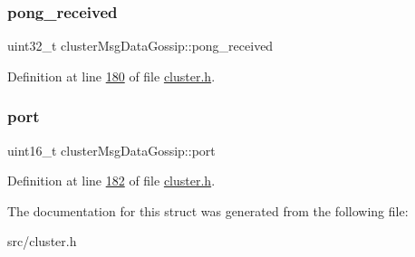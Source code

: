 \mbox{\label{structclusterMsgDataGossip_acd8f681b7d76d00bf70d27b1130c97df}} 
\subsubsection{\texorpdfstring{pong\+\_\+received}{pong\_received}}
{\footnotesize\ttfamily uint32\+\_\+t cluster\+Msg\+Data\+Gossip\+::pong\+\_\+received}



Definition at line \hyperlink{cluster_8h_source_l00180}{180} of file \hyperlink{cluster_8h_source}{cluster.\+h}.

\mbox{\label{structclusterMsgDataGossip_a6a38835f189c60b4c9ea9be5c817e6af}} 
\subsubsection{\texorpdfstring{port}{port}}
{\footnotesize\ttfamily uint16\+\_\+t cluster\+Msg\+Data\+Gossip\+::port}



Definition at line \hyperlink{cluster_8h_source_l00182}{182} of file \hyperlink{cluster_8h_source}{cluster.\+h}.



The documentation for this struct was generated from the following file\+:\begin{DoxyCompactItemize}
\item 
src/cluster.\+h\end{DoxyCompactItemize}
